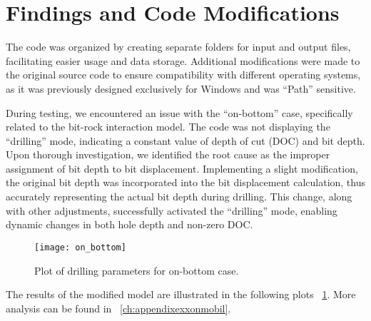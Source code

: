 \section{Findings and Code Modifications}
 
The code was organized by creating separate folders for input and output files, facilitating easier usage and data storage. Additional modifications were made to the original source code to ensure compatibility with different operating systems, as it was previously designed exclusively for Windows and was ``Path'' sensitive.

During testing, we encountered an issue with the ``on-bottom'' case, specifically related to the bit-rock interaction model. The code was not displaying the ``drilling'' mode, indicating a constant value of depth of cut (DOC) and bit depth. Upon thorough investigation, we identified the root cause as the improper assignment of bit depth to bit displacement. Implementing a slight modification, the original bit depth was incorporated into the bit displacement calculation, thus accurately representing the actual bit depth during drilling. This change, along with other adjustments, successfully activated the ``drilling'' mode, enabling dynamic changes in both hole depth and non-zero DOC.

\begin{figure}
  \centering
  \texttt{[image: on\_bottom]}
  \caption[Plots of on-bottom case]{Plot of drilling parameters for on-bottom case.}\label{findings}
\end{figure}

The results of the modified model are illustrated in the following plots \figurename~\ref{findings}. More analysis can be found in \appendixname~\ref{ch:appendixexxonmobil}. 